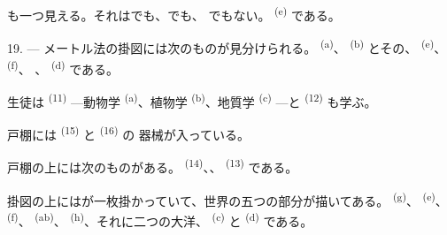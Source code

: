 も一つ見える。それはでも、でも、
でもない。 \textsuperscript{(e)} である。

19. --- メートル法の掛図には次のものが見分けられる。
\textsuperscript{(a)}、 \textsuperscript{(b)} とその、
 \textsuperscript{(e)}、 \textsuperscript{(f)}、
、 \textsuperscript{(d)} である。

生徒は \textsuperscript{(11)} ---動物学 \textsuperscript{(a)}、植物学
\textsuperscript{(b)}、地質学 \textsuperscript{(c)} ---と
\textsuperscript{(12)} も学ぶ。

戸棚には \textsuperscript{(15)} と \textsuperscript{(16)} の
器械が入っている。

戸棚の上には次のものがある。 \textsuperscript{(14)}、、
 \textsuperscript{(13)} である。

掛図の上にはが一枚掛かっていて、世界の五つの部分が描いてある。
 \textsuperscript{(g)}、 \textsuperscript{(e)}、
 \textsuperscript{(f)}、 \textsuperscript{(ab)}、
 \textsuperscript{(h)}、それに二つの大洋、
\textsuperscript{(c)} と \textsuperscript{(d)} である。
\VUsaut{6.0mm}
\VUfilet{22mm}
